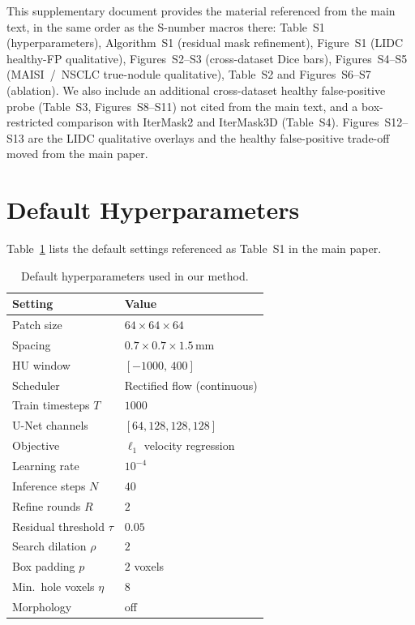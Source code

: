 \documentclass[twoside]{article}
\begin{document}

This supplementary document provides the material referenced from the
main text, in the same order as the S-number macros there:
Table~S1 (hyperparameters),
Algorithm~S1 (residual mask refinement),
Figure~S1 (LIDC healthy-FP qualitative),
Figures~S2--S3 (cross-dataset Dice bars),
Figures~S4--S5 (MAISI~/~NSCLC true-nodule qualitative),
Table~S2 and Figures~S6--S7 (ablation).
We also include an additional cross-dataset healthy false-positive
probe (Table~S3, Figures~S8--S11) not cited from the main text,
and a box-restricted comparison with IterMask2 and IterMask3D
(Table~S4).
Figures~S12--S13 are the LIDC qualitative overlays and the healthy
false-positive trade-off moved from the main paper.

\section{Default Hyperparameters}
\label{sec:supp:hparams}
Table~\ref{tab:hparams} lists the default settings referenced as
Table~S1 in the main paper.

\begin{table}[t]
\centering
\caption{Default hyperparameters used in our method.}
\label{tab:hparams}
\begin{tabular}{@{}ll@{}}
\toprule
\textbf{Setting} & \textbf{Value} \\
\midrule
Patch size & \(64\times 64\times 64\) \\
Spacing & \(0.7\times 0.7\times 1.5\,\mathrm{mm}\) \\
HU window & \([-1000,\,400]\) \\
Scheduler & Rectified flow (continuous) \\
Train timesteps \(T\) & \(1000\) \\
U-Net channels & \([64,128,128,128]\) \\
Objective & \(\ell_1\) velocity regression \\
Learning rate & \(10^{-4}\) \\
Inference steps \(N\) & \(40\) \\
Refine rounds \(R\) & \(2\) \\
Residual threshold \(\tau\) & \(0.05\) \\
Search dilation \(\rho\) & \(2\) \\
Box padding \(p\) & \(2\) voxels \\
Min.\ hole voxels \(\eta\) & \(8\) \\
Morphology & off \\
\bottomrule
\end{tabular}
\end{table}
\FloatBarrier
\end{document}
